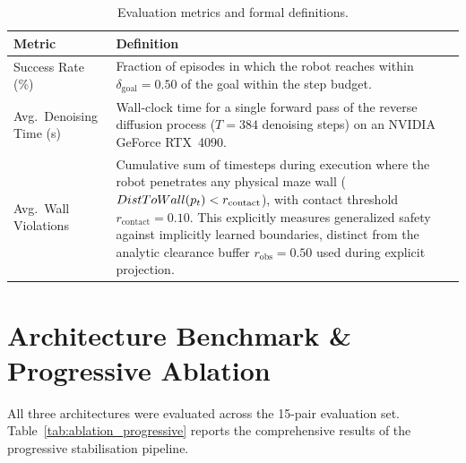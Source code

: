 \documentclass[12pt, a4paper, oneside]{report}
\theoremstyle{definition}
\begin{document}
\begin{table}[H]
\centering
\caption{Evaluation metrics and formal definitions.}
\label{tab:metrics}
\begin{tabularx}{\linewidth}{@{}lX@{}}
\toprule
\textbf{Metric} & \textbf{Definition} \\
\midrule
Success Rate (\%)
  & Fraction of episodes in which the robot reaches within
    $\delta_{\mathrm{goal}} = 0.50$ of the goal within
    the step budget.\\[4pt]
Avg.\ Denoising Time (s)
  & Wall-clock time for a single forward pass of the reverse
    diffusion process ($T=384$ denoising steps)
    on an NVIDIA GeForce RTX~4090.\\[4pt]
Avg.\ Wall Violations
  & Cumulative sum of timesteps during execution where the robot
    penetrates any physical maze wall ($DistToWall(p_t) < r_{\mathrm{contact}}$),
    with contact threshold $r_{\mathrm{contact}}=0.10$. This explicitly measures 
    generalized safety against implicitly learned boundaries, distinct from the analytic
    clearance buffer $r_{\mathrm{obs}}=0.50$ used during explicit projection.\\
\bottomrule
\end{tabularx}
\end{table}

\section{Architecture Benchmark \& Progressive Ablation}
\label{sec:benchmark}

All three architectures were evaluated across the 15-pair evaluation set.
Table~\ref{tab:ablation_progressive} reports the comprehensive results
of the progressive stabilisation pipeline.
\end{document}
